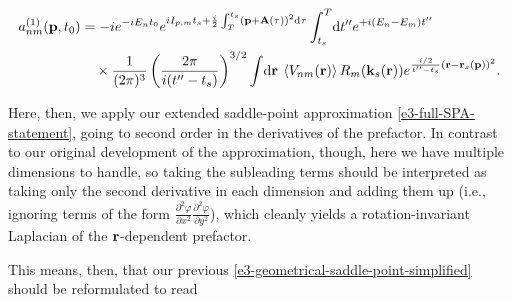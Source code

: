 \begin{align}
a_{nm}^{(1)}(\vb{p},{t_0})
& =
-i
e^{-iE_n {t_0}}
e^{iI_{p,m} {t_s}+\frac{i}{2} \int_T^{{t_s}}\left(\vb{p}+\vb{A}(\tau)\right)^2\mathrm{d}\tau} 
\int_{{t_s}}^T\!\mathrm{d} t''
e^{+i(E_n-E_m)t''}
\nonumber \\ & \quad \times
\frac{1}{(2\pi)^{3}}
\left(
 \frac{2\pi}{i(t''-{t_s})}
 \right)^{3/2}
\int\!\mathrm{d}\vb{r} \:
\left\langle V_{nm}\mathopen{}\left( \vb{r} \right)\mathclose{} \right\rangle
R_m(\vb{k}_s(\vb{r}))
e^{\frac{i/2}{t''-{t_s}} (\vb{r}-\vb{r}_s(\vb{p}))^2}
.
\label{e3-correlation-driven-yield-reprise-after-k-integral}
\end{align}


Here, then, we apply our extended saddle-point approximation \eqref{e3-full-SPA-statement}, going to second order in the derivatives of the prefactor. In contrast to our original development of the approximation, though, here we have multiple dimensions to handle, so taking the subleading terms should be interpreted as taking only the second derivative in each dimension and adding them up (i.e., ignoring terms of the form $\frac{\partial^2\varphi}{\partial x^2} \frac{ \partial^2 \varphi}{\partial y^2}$), which cleanly yields a rotation-invariant Laplacian of the $\vb{r}$-dependent prefactor.

This means, then, that our previous \eqref{e3-geometrical-saddle-point-simplified} should be reformulated to read

